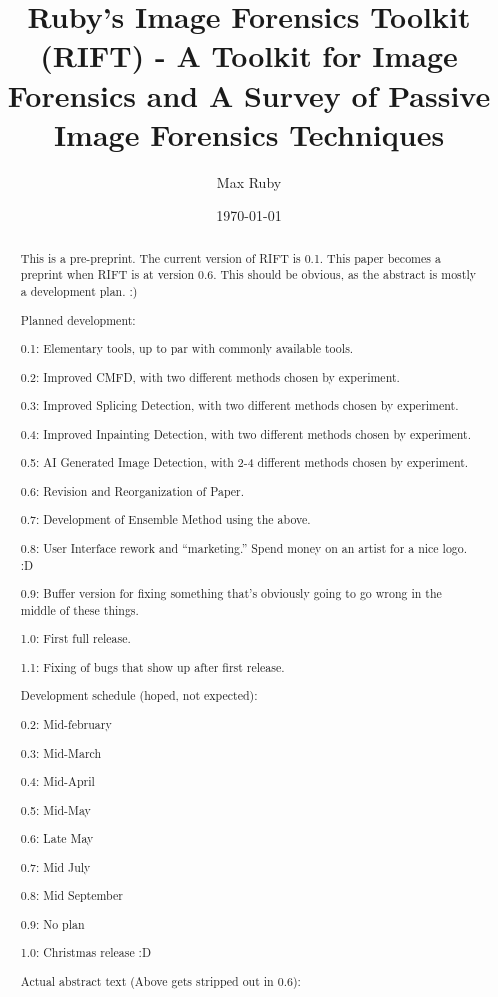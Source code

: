 \documentclass[compsoc]{IEEEtran}
\begin{document}
\title{Ruby's Image Forensics Toolkit (RIFT) - A Toolkit for Image Forensics and A Survey of Passive Image Forensics Techniques}
\author{Max Ruby}

\date{\today}
\maketitle
\begin{abstract}
This is a pre-preprint. The current version of RIFT is 0.1. This paper becomes a preprint when RIFT is at version 0.6. This should be obvious, as the abstract is mostly a development plan. :)

Planned development:

0.1: Elementary tools, up to par with commonly available tools.

0.2: Improved CMFD, with two different methods chosen by experiment.

0.3: Improved Splicing Detection, with two different methods chosen by experiment.

0.4: Improved Inpainting Detection, with two different methods chosen by experiment.

0.5: AI Generated Image Detection, with 2-4 different methods chosen by experiment.

0.6: Revision and Reorganization of Paper.

0.7: Development of Ensemble Method using the above.

0.8: User Interface rework and ``marketing.'' Spend money on an artist for a nice logo. :D

0.9: Buffer version for fixing something that's obviously going to go wrong in the middle of these things.

1.0: First full release.

1.1: Fixing of bugs that show up after first release.

Development schedule (hoped, not expected):

0.2: Mid-february

0.3: Mid-March

0.4: Mid-April

0.5: Mid-May

0.6: Late May

0.7: Mid July

0.8: Mid September

0.9: No plan

1.0: Christmas release :D

Actual abstract text (Above gets stripped out in 0.6):


\end{abstract}
\end{document}
